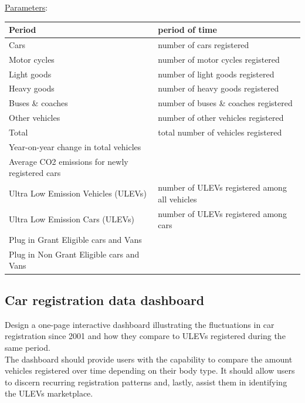 \documentclass[11pt]{article}
\begin{document}
\underline{Parameters}:
\begin{table}[h!]
    \centering
    \begin{tabular}{|l|m{8cm}|}
        \hline
        Period & period of time \\
        \hline
        Cars & number of cars registered \\
        \hline
        Motor cycles & number of motor cycles registered \\
        \hline
        Light goods & number of light goods registered \\
        \hline
        Heavy goods & number of heavy goods registered \\
        \hline
        Buses \& coaches & number of buses \& coaches registered \\
        \hline
        Other vehicles & number of other vehicles registered \\
        \hline
        Total & total number of vehicles registered \\
        \hline
        Year-on-year change in total vehicles &  \\
        \hline
        Average CO2 emissions for newly registered cars &  \\
        \hline
        Ultra Low Emission Vehicles (ULEVs) & number of ULEVs registered among all vehicles \\
        \hline
        Ultra Low Emission Cars (ULEVs) & number of ULEVs registered among cars \\
        \hline
        Plug in Grant Eligible cars and Vans &  \\
        \hline
        Plug in Non Grant Eligible cars and Vans &  \\
        \hline
    \end{tabular}
\end{table}

\subsection{Car registration data dashboard}

Design a one-page interactive dashboard illustrating the fluctuations in car registration since 2001 and how they compare to ULEVs registered during the same period.\\

The dashboard should provide users with the capability to compare the amount vehicles registered over time depending on their body type. It should allow users to discern recurring registration patterns and, lastly, assist them in identifying the ULEVs marketplace.\\
\end{document}
